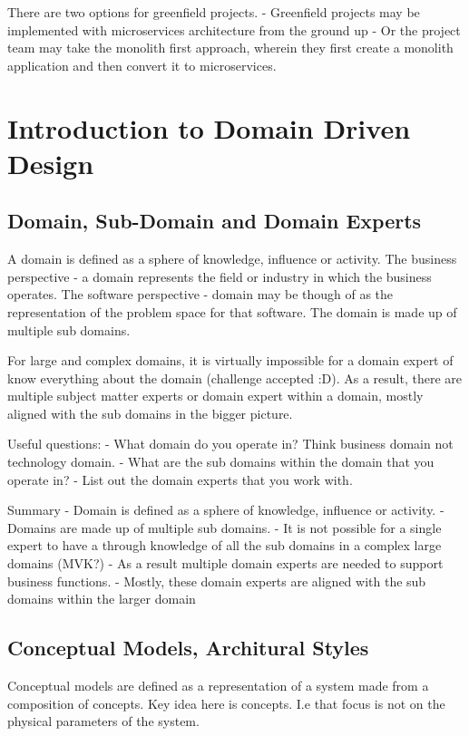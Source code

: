 \documentclass[a4paper, 11pt]{book}
\begin{document}
    There are two options for greenfield projects.
    - Greenfield projects may be implemented with microservices architecture from the ground up
    - Or the project team may take the monolith first approach, wherein they first create a monolith application and then convert it to microservices.


    \chapter{Introduction to Domain Driven Design}


    \section{Domain, Sub-Domain and Domain Experts}
    A domain is defined as a sphere of knowledge, influence or activity.
    The business perspective - a domain represents the field or industry in which the business operates.
    The software perspective - domain may be though of as the representation of the problem space for that software. The domain is made up of multiple sub domains.

    For large and complex domains, it is virtually impossible for a domain expert of know everything about the domain (challenge accepted :D).
    As a result, there are multiple subject matter experts or domain expert within a domain, mostly aligned with the sub domains in the bigger picture.

    Useful questions:
    - What domain do you operate in? Think business domain not technology domain.
    - What are the sub domains within the domain that you operate in?
    - List out the domain experts that you work with.

    Summary
    - Domain is defined as a sphere of knowledge, influence or activity.
    - Domains are made up of multiple sub domains.
    - It is not possible for a single expert to have a through knowledge of all the sub domains in a complex large domains (MVK?)
    - As a result multiple domain experts are needed to support business functions.
    - Mostly, these domain experts are aligned with the sub domains within the larger domain


    \section{Conceptual Models, Architural Styles}
    Conceptual models are defined as a representation of a system made from a composition of concepts. Key idea here is concepts.
    I.e that focus is not on the physical parameters of the system.
\end{document}
